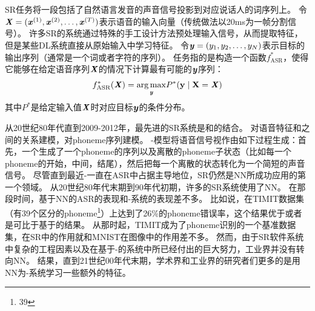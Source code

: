 \section{}
\label{sec:speech_recognition}

\gls{SR}任务将一段包括了自然语言发音的声音信号投影到对应说话人的词序列上。
令$\boldsymbol{\mathit{X}}=(\boldsymbol{\mathit{x}}^{(1)},\boldsymbol{\mathit{x}}^{(2)},\ldots,\boldsymbol{\mathit{x}}^{(T)})$表示语音的输入向量（传统做法以20ms为一帧分割信号）。
许多\gls{SR}的系统通过特殊的手工设计方法预处理输入信号，从而提取特征，但是某些\gls{DL}系统\citep{jaitly2011learning}直接从原始输入中学习特征。
令$\boldsymbol{\mathit{y}}=(y_{1},y_{2},\ldots,y_{N})$表示目标的输出序列（通常是一个词或者字符的序列）。
任务指的是构造一个函数$f^*_{\text{ASR}}$，使得它能够在给定语音序列$\boldsymbol{\mathit{X}}$的情况下计算最有可能的$\boldsymbol{\mathit{y}}$序列：
\begin{align}
\label{eqn:124}
f^*_{\text{ASR}}(\boldsymbol{\mathit{X}}) =  \underset{\boldsymbol{\mathit{y}}}{\arg\max}  P^*(\mathbf{y} \mid \boldsymbol{\mathrm{X}} = \boldsymbol{\mathit{X}})
\end{align}
其中$P^*$是给定输入值$\boldsymbol{\mathit{X}}$时对应目标$\boldsymbol{\mathit{y}}$的条件分布。

从20世纪80年代直到2009-2012年，最先进的\gls{SR}系统是和的结合。
对语音特征和之间的关系建模\citep{Bahl87}，对\gls{phoneme}序列建模。
-模型将语音信号视作由如下过程生成：首先，一个生成了一个\gls{phoneme}的序列以及离散的\gls{phoneme}子状态（比如每一个\gls{phoneme}的开始，中间，结尾），然后把每一个离散的状态转化为一个简短的声音信号。
尽管直到最近-一直在\gls{ASR}中占据主导地位，\gls{SR}仍然是\gls{NN}所成功应用的第一个领域。
从20世纪80年代末期到90年代初期，许多的\gls{SR}系统使用了\gls{NN}\citep{Bourlard-cspla89,Waibel89b,Robinson+Fallside91,Bengio91z,Bengio92c,Konig96}。
在那段时间，基于\gls{NN}的\gls{ASR}的表现和-系统的表现差不多。
比如说，\citet{Robinson+Fallside91}在TIMIT数据集\citep{garofolo1993darpa}（有39个区分的\gls{phoneme}\footnote{39}）上达到了26\%的\gls{phoneme}错误率，这个结果优于或者是可比于基于的结果。
从那时起，TIMIT成为了\gls{phoneme}识别的一个基准数据集，在\gls{SR}中的作用就和MNIST在图像中的作用差不多。
然而，由于\gls{SR}软件系统中复杂的工程因素以及在基于-的系统中所已经付出的巨大努力，工业界并没有转向\gls{NN}。
结果，直到21世纪00年代末期，学术界和工业界的研究者们更多的是用\gls{NN}为-系统学习一些额外的特征。


